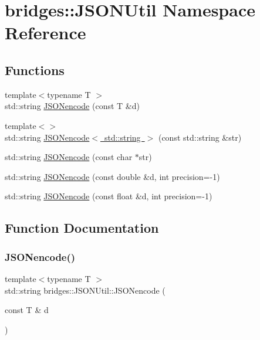 \hypertarget{namespacebridges_1_1_j_s_o_n_util}{}\section{bridges\+::J\+S\+O\+N\+Util Namespace Reference}
\label{namespacebridges_1_1_j_s_o_n_util}
\subsection*{Functions}
\begin{DoxyCompactItemize}
\item 
{\footnotesize template$<$typename T $>$ }\\std\+::string \mbox{\hyperlink{namespacebridges_1_1_j_s_o_n_util_a8510af8bef5b7bf4062d6f25eceb20b4}{J\+S\+O\+Nencode}} (const T \&d)
\item 
{\footnotesize template$<$$>$ }\\std\+::string \mbox{\hyperlink{namespacebridges_1_1_j_s_o_n_util_a8db4f538e31bd8369e51a46802708f3d}{J\+S\+O\+Nencode$<$ std\+::string $>$}} (const std\+::string \&str)
\item 
std\+::string \mbox{\hyperlink{namespacebridges_1_1_j_s_o_n_util_a6a5122ccf58c08737d70437267674799}{J\+S\+O\+Nencode}} (const char $\ast$str)
\item 
std\+::string \mbox{\hyperlink{namespacebridges_1_1_j_s_o_n_util_aa98c84a92a032c2ab78dbc087d0a0754}{J\+S\+O\+Nencode}} (const double \&d, int precision=-\/1)
\item 
std\+::string \mbox{\hyperlink{namespacebridges_1_1_j_s_o_n_util_a661209c42479be511132855fac24cd08}{J\+S\+O\+Nencode}} (const float \&d, int precision=-\/1)
\end{DoxyCompactItemize}


\subsection{Function Documentation}
\mbox{\label{namespacebridges_1_1_j_s_o_n_util_a8510af8bef5b7bf4062d6f25eceb20b4}} 
\subsubsection{\texorpdfstring{JSONencode()}{JSONencode()}\hspace{0.1cm}{\footnotesize\ttfamily [1/4]}}
{\footnotesize\ttfamily template$<$typename T $>$ \\
std\+::string bridges\+::\+J\+S\+O\+N\+Util\+::\+J\+S\+O\+Nencode (\begin{DoxyParamCaption}\item[{const T \&}]{d }\end{DoxyParamCaption})\hspace{0.3cm}{\ttfamily [inline]}}

